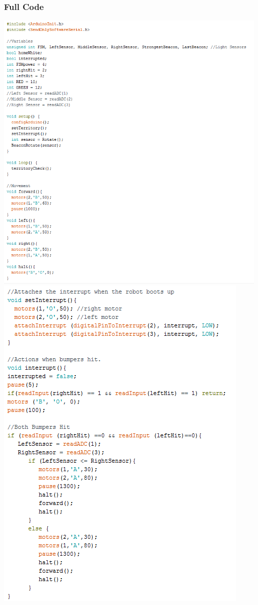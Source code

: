 \documentclass{article}
\begin{document}
    \subsubsection{Full Code}
\begin{center}
\includegraphics[width=\textwidth]{FullCode1.png}
\includegraphics[]{FullCode2.png}

\end{center}
\end{document}
